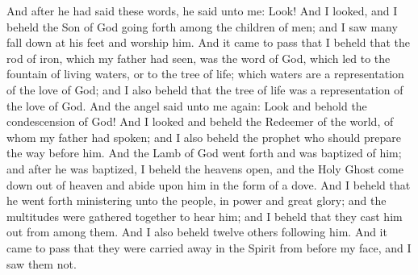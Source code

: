 And after he had said these words, he said unto me: Look!  And I looked, and I beheld the Son of God going forth among the children of men; and I saw many fall down at his feet and worship him.
\bverse \iffalse And it came to pass that I beheld that the rod of iron, which my father had seen, was the word of God, which led to the fountain of living waters, or to the tree of life; which waters are a representation of the love of God; and I also beheld that the tree of life was a representation of the love of God. \fi
And it came to pass that I beheld that the rod of iron, which my father had seen, was the word of God, which led to the fountain of living waters, or to the tree of life; which waters are a representation of the love of God; and I also beheld that the tree of life was a representation of the love of God.
\bverse \iffalse And the angel said unto me again: Look and behold the condescension of God! \fi
And the angel said unto me again: Look and behold the condescension of God!
\bverse \iffalse And I looked and beheld the Redeemer of the world, of whom my father had spoken; and I also beheld the prophet who should prepare the way before him. And the Lamb of God went forth and was baptized of him; and after he was baptized, I beheld the heavens open, and the Holy Ghost come down out of heaven and abide upon him in the form of a dove. \fi
And I looked and beheld the Redeemer of the world, of whom my father had spoken; and I also beheld the prophet who should prepare the way before him. And the Lamb of God went forth and was baptized of him; and after he was baptized, I beheld the heavens open, and the Holy Ghost come down out of heaven and abide upon him in the form of a dove.
\bverse \iffalse And I beheld that he went forth ministering unto the people, in power and great glory; and the multitudes were gathered together to hear him; and I beheld that they cast him out from among them. \fi
And I beheld that he went forth ministering unto the people, in power and great glory; and the multitudes were gathered together to hear him; and I beheld that they cast him out from among them.
\bverse \iffalse And I also beheld twelve others following him. And it came to pass that they were carried away in the Spirit from before my face, and I saw them not. \fi
And I also beheld twelve others following him. And it came to pass that they were carried away in the Spirit from before my face, and I saw them not.
\bverse \iffalse And it came to pass that the angel spake unto me again, saying: Look! And I looked, and I beheld the heavens open again, and I saw angels descending upon the children of men; and they did minister unto them. \fi
